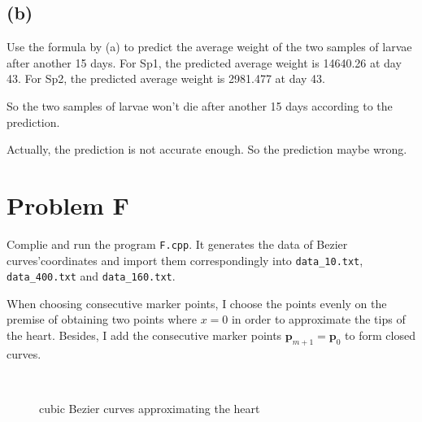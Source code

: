 \documentclass[a4paper]{article}
\begin{document}
\subsection*{(b)}
Use the formula by (a) to predict the average weight of the two samples of larvae after another 15 days. 
For Sp1, the predicted average weight is 14640.26 at day 43. For Sp2, the predicted average weight is 2981.477 at day 43.

So the two samples of larvae won't die after another 15 days according to the prediction.

Actually, the prediction is not accurate enough. So the prediction maybe wrong. 

\section*{Problem F}
Complie and run the program \verb|F.cpp|. It generates the data of Bezier curves'coordinates and import them correspondingly into \verb|data_10.txt|, \verb|data_400.txt| and \verb|data_160.txt|. 

When choosing consecutive marker points, I choose the points evenly on the premise of obtaining two points where $x=0$ in order to approximate the tips of the heart. Besides, I add the consecutive marker points $\mathbf{p}_{m+1}=\mathbf{p}_{0}$ to form closed curves.
\begin{figure}[htbp]
  \centering
  \\
  \renewcommand{\figurename}{Fig.}
  \caption{cubic Bezier curves approximating the heart}
  \label{fig4}
\end{figure}
\end{document}
